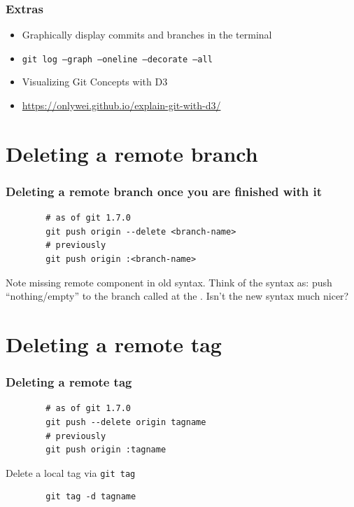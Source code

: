\begin{frame}
    \frametitle{Extras}
    \begin{itemize}
        \item Graphically display commits and branches in the terminal
        \item \texttt{git log --graph --oneline --decorate --all}
        \item Visualizing Git Concepts with D3
        \item \url{https://onlywei.github.io/explain-git-with-d3/}
    \end{itemize}
\end{frame}

\section{Deleting a remote branch}

\begin{frame}[fragile]
    \frametitle{Deleting a remote branch once you are finished with it}

    \begin{verbatim}
        # as of git 1.7.0
        git push origin --delete <branch-name>
        # previously
        git push origin :<branch-name>
    \end{verbatim}

    Note missing remote component in old syntax.  Think of the syntax as:
    push ``nothing/empty'' to the branch called  at the
    .  Isn't the new syntax much nicer?
\end{frame}

\section{Deleting a remote tag}

\begin{frame}[fragile]
\frametitle{Deleting a remote tag}

    \begin{verbatim}
        # as of git 1.7.0
        git push --delete origin tagname
        # previously
        git push origin :tagname
    \end{verbatim}
\end{frame}

\begin{frame}[fragile]{Delete a local tag via \texttt{git tag}}
    \begin{verbatim}
        git tag -d tagname
    \end{verbatim}
\end{frame}

